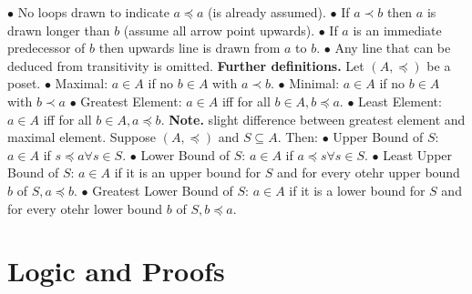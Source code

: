 \documentclass{article}
\begin{document}
\newline
$\bullet $ No loops drawn to indicate $a \preceq a$ (is already assumed).
\newline
$\bullet $ If $a \prec b$ then $a$ is drawn longer than $b$ (assume all arrow point upwards).
\newline
$\bullet $ If $a$ is an immediate predecessor of $b$ then upwards line is drawn from $a$ to $b$.
\newline
$\bullet $ Any line that can be deduced from transitivity is omitted.
\newline
{}
\newline
\newline
\textbf{Further definitions. } Let $(A, \preceq)$ be a poset.
\newline 
$\bullet $ Maximal: $a \in A$ if no $b \in A$ with $a \prec b$.
\newline 
$\bullet $ Minimal: $a \in A$ if no $b \in A$ with $b \prec a$
\newline 
$\bullet $ Greatest Element: $a \in A$ iff for all $b \in A, b \preceq a$.
\newline 
$\bullet $ Least Element: $a \in A$ iff for all $b \in A, a \preceq b$.
\newline 
\newline
\textbf{Note. } slight difference between greatest element and maximal element.
\newline 
{}
\newline 
\newline
Suppose $(A, \preceq)$ and $S \subseteq A$. Then: 
\newline
$\bullet $ Upper Bound of $S$: $a \in A$ if $s \preceq a \forall s \in S$.
\newline
$\bullet $ Lower Bound of $S$: $a \in A$ if $a \preceq s \forall s \in S$.
\newline
$\bullet $ Least Upper Bound of $S$: $a \in A$ if it is an upper bound for $S$ and for every otehr upper bound $b$ of $S, a \preceq b$.
\newline
$\bullet $ Greatest Lower Bound of $S$: $a \in A$ if it is a lower bound for $S$ and for every otehr lower bound $b$ of $S, b \preceq a$.
\newline 
{}
\newpage
\section{Logic and Proofs}
\end{document}
